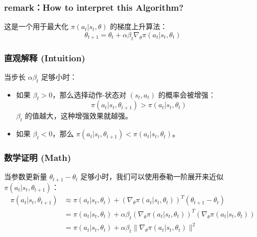 \documentclass{article}
\begin{document}
\subsubsection*{remark：How to interpret this Algorithm?}

这是一个用于最大化 $\pi(a_t|s_t, \theta)$ 的梯度上升算法：
\[
\theta_{t+1} = \theta_t + \alpha \beta_t \nabla_{\theta} \pi(a_t|s_t, \theta_t)
\]

\subsubsection*{直观解释 (Intuition)}
当步长 $\alpha \beta_t$ 足够小时：
\begin{itemize}
    \item 如果 $\beta_t > 0$，那么选择动作-状态对 $(s_t, a_t)$ 的概率会被增强：
    \[
    \pi(a_t|s_t, \theta_{t+1}) > \pi(a_t|s_t, \theta_t)
    \]
    $\beta_t$ 的值越大，这种增强效果就越强。
    \item 如果 $\beta_t < 0$，那么 $\pi(a_t|s_t, \theta_{t+1}) < \pi(a_t|s_t, \theta_t)$。
\end{itemize}

\subsubsection*{数学证明 (Math)}
当参数更新量 $\theta_{t+1} - \theta_t$ 足够小时，我们可以使用泰勒一阶展开来近似 $\pi(a_t|s_t, \theta_{t+1})$：
\begin{align*}
    \pi(a_t|s_t, \theta_{t+1}) &\approx \pi(a_t|s_t, \theta_t) + (\nabla_{\theta} \pi(a_t|s_t, \theta_t))^T (\theta_{t+1} - \theta_t) \\
    &= \pi(a_t|s_t, \theta_t) + \alpha \beta_t (\nabla_{\theta} \pi(a_t|s_t, \theta_t))^T (\nabla_{\theta} \pi(a_t|s_t, \theta_t)) \\
    &= \pi(a_t|s_t, \theta_t) + \alpha \beta_t \|\nabla_{\theta} \pi(a_t|s_t, \theta_t)\|^2
\end{align*}
\end{document}
